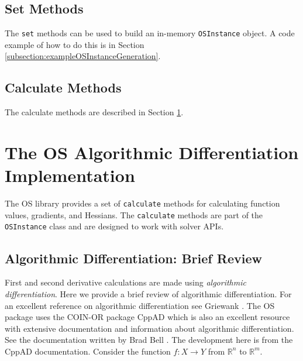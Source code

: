 \documentclass[11pt]{article}
\renewcommand{\_}{{\char"5F}}
\renewcommand{\{}{{\char"7B}}
\renewcommand{\}}{{\char"7D}}
\renewcommand{\^}{{\char"0D}}
\renewcommand{\'}{{\char"0D}}
\begin{document}
\subsection{Set Methods}

The {\tt set} methods can be used to build an in-memory {\tt OSInstance}
 object. A code example of how to do this is in Section \ref{subsection:exampleOSInstanceGeneration}. 

\subsection{Calculate Methods}

The calculate methods are described in Section \ref{section:ad}.

\section{The OS Algorithmic Differentiation Implementation}\label{section:ad}

The OS library provides a set of {\tt calculate} methods for calculating  function values, gradients, and Hessians.     The {\tt calculate} methods are part of the {\tt OSInstance} class and are designed to work with solver APIs.



\subsection{Algorithmic Differentiation:  Brief Review}\label{section:adtheory}

First and second derivative calculations are made using {\it  algorithmic differentiation}.  Here we provide a brief review of algorithmic differentiation.  For an excellent reference on algorithmic differentiation see Griewank \cite{griewank2000}.  The OS package uses the COIN-OR package CppAD which  is also an excellent resource with extensive  documentation and information about algorithmic differentiation. See the documentation written by  Brad Bell \cite{bell2007}.    The development here is from the CppAD documentation.  Consider the function $f:X \rightarrow Y$ from $ \mathbb{R}^{n}$ to $ \mathbb{R}^{m}.$ 
\end{document}
